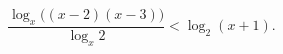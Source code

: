 \begin{ex}[type=inequality]
	\begin{condition}
		$ \dfrac{\log_x\big((x - 2)(x - 3)\big)}{\log_x 2}<\log_2 (x + 1) .$
	\end{condition}
\end{ex}